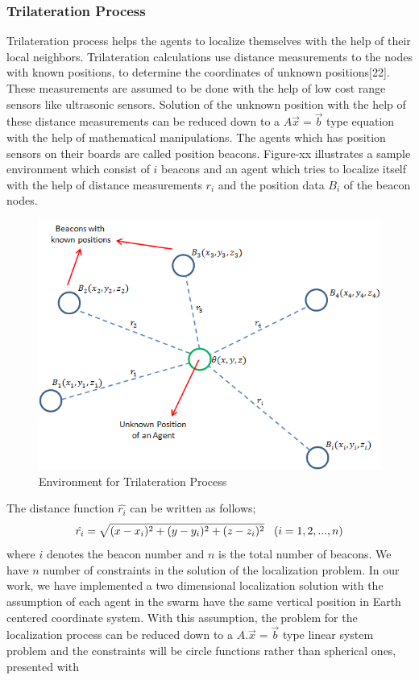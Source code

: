 \documentclass[twoside]{article}
\begin{document}
\subsubsection{Trilateration Process}

Trilateration process helps the agents to localize themselves with the help of their local neighbors.  Trilateration calculations use distance measurements to the nodes with known positions, to determine the coordinates of unknown positions[22]. These measurements are assumed to be done with the help of low cost range sensors like ultrasonic sensors.  Solution of the unknown position with the help of these distance measurements can be reduced down to a $A\vec{x} = \vec{b}$ type equation with the help of mathematical manipulations. The agents which has position sensors on their boards are called position beacons. Figure-xx illustrates a sample environment which consist of $i$ beacons and an agent which tries to localize itself with the help of distance measurements $r_i$ and the position data $B_i$ of the beacon nodes.
\begin{figure}[H]
	\caption{Environment for Trilateration Process}
	\centering
	\includegraphics[scale = 0.65]{beacons}
\end{figure}

The distance function $\hat{r_i}$ can be written as follows;
\begin{equation} %
\hat{r_i} = \sqrt{(x-x_i)^2 + (y-y_i)^2+ (z-z_i)^2}    \hspace{0.3cm}   (i=1,2,...,n)
\end{equation}
where $i$ denotes the beacon number and $n$ is the total number of beacons. We have $n$ number of constraints in the solution of the localization problem. In our work, we have implemented a two dimensional localization solution with the assumption of each agent in the swarm have the same vertical position in Earth centered coordinate system. With this assumption, the problem for the localization process can be reduced down to a $A.\vec{x} =\vec{b} $ type linear system problem and the constraints will be circle functions rather than spherical ones, presented with
\end{document}
